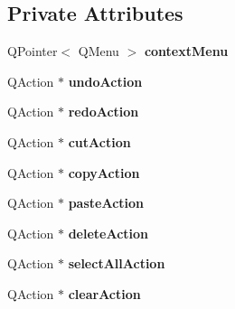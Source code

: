 \subsection*{Private Attributes}
\begin{DoxyCompactItemize}
\item 
\hypertarget{class_ru_q_text_edit_aae1b11fbabd5cc5a6d83f0e8b0013965}{}Q\+Pointer$<$ Q\+Menu $>$ {\bfseries context\+Menu}\label{class_ru_q_text_edit_aae1b11fbabd5cc5a6d83f0e8b0013965}

\item 
\hypertarget{class_ru_q_text_edit_a72a48f39790a5f7b559c501c0caa153d}{}Q\+Action $\ast$ {\bfseries undo\+Action}\label{class_ru_q_text_edit_a72a48f39790a5f7b559c501c0caa153d}

\item 
\hypertarget{class_ru_q_text_edit_a7b2b190d834ac530192f58b09ddd5c21}{}Q\+Action $\ast$ {\bfseries redo\+Action}\label{class_ru_q_text_edit_a7b2b190d834ac530192f58b09ddd5c21}

\item 
\hypertarget{class_ru_q_text_edit_ac1b1b077f5d46920f273403768b9893b}{}Q\+Action $\ast$ {\bfseries cut\+Action}\label{class_ru_q_text_edit_ac1b1b077f5d46920f273403768b9893b}

\item 
\hypertarget{class_ru_q_text_edit_ab267bc74de48b1f546917739084d28a4}{}Q\+Action $\ast$ {\bfseries copy\+Action}\label{class_ru_q_text_edit_ab267bc74de48b1f546917739084d28a4}

\item 
\hypertarget{class_ru_q_text_edit_aa978383f49eabf0ac51066c321c21248}{}Q\+Action $\ast$ {\bfseries paste\+Action}\label{class_ru_q_text_edit_aa978383f49eabf0ac51066c321c21248}

\item 
\hypertarget{class_ru_q_text_edit_ad049ff4284897924607c429e15243cf7}{}Q\+Action $\ast$ {\bfseries delete\+Action}\label{class_ru_q_text_edit_ad049ff4284897924607c429e15243cf7}

\item 
\hypertarget{class_ru_q_text_edit_ae6c0886a95235ca04f7873f73997ecab}{}Q\+Action $\ast$ {\bfseries select\+All\+Action}\label{class_ru_q_text_edit_ae6c0886a95235ca04f7873f73997ecab}

\item 
\hypertarget{class_ru_q_text_edit_a873f730061faeca79d8fadd6f5f18556}{}Q\+Action $\ast$ {\bfseries clear\+Action}\label{class_ru_q_text_edit_a873f730061faeca79d8fadd6f5f18556}

\end{DoxyCompactItemize}


